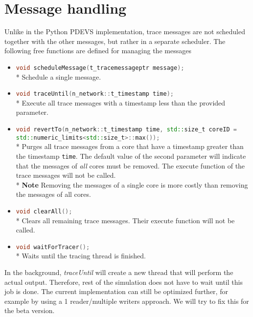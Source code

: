 \documentclass[12pt]{article}
\newcommand{\inlinecpp}[1]{\lstinline[language=c++]{#1}}
\begin{document}
\section{Message handling}
Unlike in the Python PDEVS implementation, trace messages are not scheduled together with the other messages, but rather in a separate scheduler. The following free functions are defined for managing the messages
\begin{itemize}
	\item \inlinecpp{void scheduleMessage(t_tracemessageptr message);}\\*
			Schedule a single message.
	\item \inlinecpp{void traceUntil(n_network::t_timestamp time);}\\*
			Execute all trace messages with a timestamp less than the provided parameter.
	\item \inlinecpp{void revertTo(n_network::t_timestamp time, std::size_t coreID = std::numeric_limits<std::size_t>::max());}\\*
			Purges all trace messages from a core that have a timestamp greater than the timestamp \inlinecpp{time}. The default value of the second parameter will indicate that the messages of \emph{all} cores must be removed. The execute function of the trace messages will not be called.\\*
			\textbf{Note} Removing the messages of a single core is more costly than removing the messages of all cores.
	\item \inlinecpp{void clearAll();}\\*
			Clears all remaining trace messages. Their execute function will not be called.
	\item \inlinecpp{void waitForTracer();}\\*
			Waits until the tracing thread is finished.
\end{itemize}
In the background, \emph{traceUntil} will create a new thread that will perform the actual output. Therefore, rest of the simulation does not have to wait until this job is done. The current implementation can still be optimized further, for example by using a 1 reader/multiple writers approach. We will try to fix this for the beta version.
\end{document}
